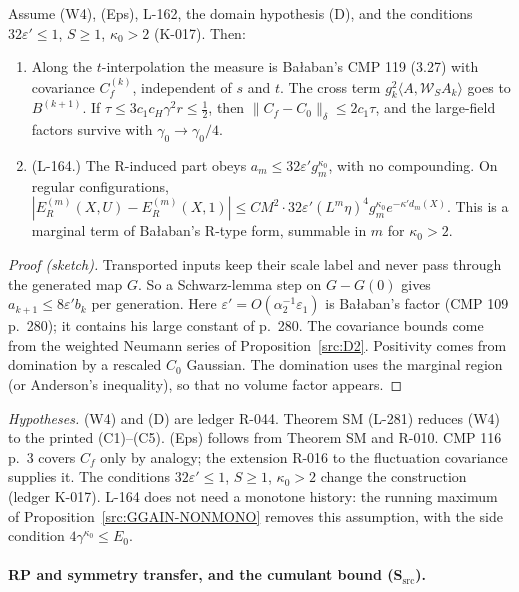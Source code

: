 \begin{proposition}\label{src:D3W8}
Assume (W4), (Eps), L-162, the domain hypothesis (D), and the conditions $32\varepsilon'\le1$, $S\ge1$, $\kappa_0>2$ (K-017). Then:
\begin{enumerate}
\item[(a)] Along the $t$-interpolation the measure is Ba{\l}aban's CMP 119 (3.27) with covariance $C_f^{(k)}$, independent of $s$ and $t$. The cross term $g_k^2\langle A,\mathcal W_SA_k\rangle$ goes to $B^{(k+1)}$. If $\tau\le3c_1c_H\gamma^2r\le\tfrac12$, then $\|C_f-C_0\|_\delta\le2c_1\tau$, and the large-field factors survive with $\gamma_0\to\gamma_0/4$.
\item[(b)] (L-164.) The R-induced part obeys $a_m\le32\varepsilon'g_m^{\kappa_0}$, with no compounding. On regular configurations, $|E_R^{(m)}(X,U)-E_R^{(m)}(X,1)|\le CM^2\cdot32\varepsilon'(L^m\eta)^4g_m^{\kappa_0}e^{-\kappa'd_m(X)}$. This is a marginal term of Ba{\l}aban's R-type form, summable in $m$ for $\kappa_0>2$.
\end{enumerate}
\end{proposition}

\begin{proof}[Proof (sketch)]
Transported inputs keep their scale label and never pass through the generated map $G$. So a Schwarz-lemma step on $G-G(0)$ gives $a_{k+1}\le8\varepsilon'b_k$ per generation. Here $\varepsilon'=O(\alpha_2^{-1}\varepsilon_1)$ is Ba{\l}aban's factor (CMP 109 p.~280); it contains his large constant of p.~280. The covariance bounds come from the weighted Neumann series of Proposition~\ref{src:D2}. Positivity comes from domination by a rescaled $C_0$ Gaussian. The domination uses the marginal region (or Anderson's inequality), so that no volume factor appears.
\end{proof}

\emph{Hypotheses.} (W4) and (D) are ledger R-044. Theorem SM (L-281) reduces (W4) to the printed (C1)--(C5). (Eps) follows from Theorem SM and R-010. CMP 116 p.~3 covers $C_f$ only by analogy; the extension R-016 to the fluctuation covariance supplies it. The conditions $32\varepsilon'\le1$, $S\ge1$, $\kappa_0>2$ change the construction (ledger K-017). L-164 does not need a monotone history: the running maximum of Proposition~\ref{src:GGAIN-NONMONO} removes this assumption, with the side condition $4\gamma^{\kappa_0}\le E_0$.

\paragraph{RP and symmetry transfer, and the cumulant bound (S$_{\mathrm{src}}$).}

